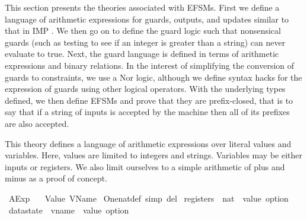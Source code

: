 %
\begin{isabellebody}%
%
%
\isadelimdocument
%
\endisadelimdocument
%
\isatagdocument
%
\isamarkuptrue%
%
\endisatagdocument
{\isafolddocument}%
%
\isadelimdocument
%
\endisadelimdocument
%
\begin{isamarkuptext}%
This section presents the theories associated with EFSMs. First we define a language of arithmetic
expressions for guards, outputs, and updates similar to that in IMP \cite{fixme}. We then go on to
define the guard logic such that nonsensical guards (such as testing to see if an integer is greater
than a string) can never evaluate to true. Next, the guard language is defined in terms of
arithmetic expressions and binary relations. In the interest of simplifying the conversion of guards
to constraints, we use a Nor logic, although we define syntax hacks for the expression of guards
using other logical operators. With the underlying types defined, we then define EFSMs and prove
that they are prefix-closed, that is to say that if a string of inputs is accepted by the machine
then all of its prefixes are also accepted.%
\end{isamarkuptext}\isamarkuptrue%
%
\isadelimdocument
%
\endisadelimdocument
%
\isatagdocument
%
\isamarkuptrue%
%
\endisatagdocument
{\isafolddocument}%
%
\isadelimdocument
%
\endisadelimdocument
%
\begin{isamarkuptext}%
This theory defines a language of arithmetic expressions over literal values and variables. Here,
values are limited to integers and strings. Variables may be either inputs or registers. We also
limit ourselves to a simple arithmetic of plus and minus as a proof of concept.%
\end{isamarkuptext}\isamarkuptrue%
%
\isadelimtheory
%
\endisadelimtheory
%
\isatagtheory
{}\isamarkupfalse%
\ AExp\isanewline
\ \ \ Value\ VName\isanewline
{}%
\endisatagtheory
{\isafoldtheory}%
%
\isadelimtheory
%
\endisadelimtheory
\isanewline
\isanewline
{}\isamarkupfalse%
\ One{\isacharunderscore}nat{\isacharunderscore}def\ {\isacharbrackleft}simp\ del{\isacharbrackright}\isanewline
\isanewline
{}\isamarkupfalse%
\ registers\ {\isacharequal}\ {\isachardoublequoteopen}nat\ {\isasymRightarrow}\ value\ option{\isachardoublequoteclose}\isanewline
{}\isamarkupfalse%
\ datastate\ {\isacharequal}\ {\isachardoublequoteopen}vname\ {\isasymRightarrow}\ value\ option{\isachardoublequoteclose}%

\end{isabellebody}
